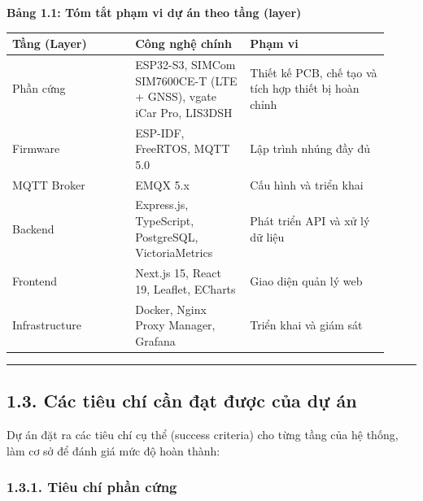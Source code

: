 \documentclass[13pt,a4paper]{extarticle}
\newcounter{none} %
\newcommand{\thesislongtableorignewline}{}
\let\thesislongtableorignewline\\
\renewcommand{\\}{\thesislongtableorignewline\hline}%
\let\\\thesislongtableorignewline
\newcommand{\thesistabletitle}[1]{%
  \begin{center}\textbf{#1}\end{center}%
}
\begin{document}
\thesistabletitle{Bảng 1.1: Tóm tắt phạm vi dự án theo tầng (layer)}

{\def\LTcaptype{none} %
\begin{longtable}{|p{0.30\linewidth}|p{0.28\linewidth}|p{0.34\linewidth}|}
\hline \textbf{Tầng (Layer)} & \textbf{Công nghệ chính} & \textbf{Phạm vi} \\
\hline
\endhead
\hline
\endlastfoot
Phần cứng & ESP32-S3, SIMCom SIM7600CE-T (LTE + GNSS), vgate iCar Pro,
LIS3DSH & Thiết kế PCB, chế tạo và tích hợp thiết bị hoàn chỉnh \\
Firmware & ESP-IDF, FreeRTOS, MQTT 5.0 & Lập trình nhúng đầy đủ \\
MQTT Broker & EMQX 5.x & Cấu hình và triển khai \\
Backend & Express.js, TypeScript, PostgreSQL, VictoriaMetrics & Phát
triển API và xử lý dữ liệu \\
Frontend & Next.js 15, React 19, Leaflet, ECharts & Giao diện quản lý
web \\
Infrastructure & Docker, Nginx Proxy Manager, Grafana & Triển khai và
giám sát \\
\end{longtable}
}

\begin{center}\rule{0.5\linewidth}{0.5pt}\end{center}

\subsection{1.3. Các tiêu chí cần đạt được của dự
án}\label{13-cuxe1c-tiuxeau-chuxed-cux1ea7n-ux111ux1ea1t-ux111ux1b0ux1ee3c-cux1ee7a-dux1ef1-uxe1n}

Dự án đặt ra các tiêu chí cụ thể (success criteria) cho từng tầng của hệ
thống, làm cơ sở để đánh giá mức độ hoàn thành:

\subsubsection{1.3.1. Tiêu chí phần
cứng}\label{131-tiuxeau-chuxed-phux1ea7n-cux1ee9ng}
\end{document}
